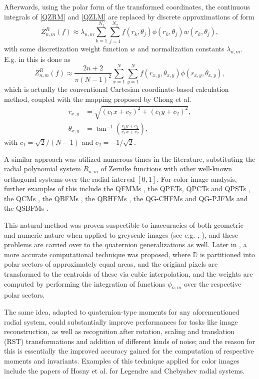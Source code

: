\documentclass[12pt]{article}
\newcommand{\D}{\mathbb{D}}
\begin{document}
Afterwards, using the polar form of the transformed coordinates, the continuous integrals of \eqref{QZRM} and \eqref{QZLM} are replaced by discrete approximations of form
\begin{equation}\label{QZRMappr}
	Z_{n,m}^R(f) \approx \lambda_{n,m} \sum_{k=1}^{N_1} \sum_{j=1}^{N_2} f(r_k,\theta_j) \phi(r_k,\theta_j) w(r_k,\theta_j),
\end{equation}
with some discretization weight function $w$ and normalization constants $\lambda_{n,m}$. E.g. in \cite{ChenOriginal} this is done as
\[
	Z_{n,m}^R(f) \approx \frac{2n+2}{\pi (N-1)^2}  \sum_{x=1}^N \sum_{y=1}^N f(r_{x,y},\theta_{x,y}) \phi(r_{x,y},\theta_{x,y}),
\]
which is actually the conventional Cartesian coordinate-based calculation method, coupled with the mapping proposed by Chong et al. \cite{Chong}
\[
\begin{split}
	r_{x,y} &= \sqrt{(c_1x + c_2)^2 + (c_1y + c_2)^2}, \\
	\theta_{x,y} &= \tan^{-1}\left(\frac{c_1y + c_2}{c_1x + c_2}\right),
\end{split}
\]
with $c_1=\sqrt{2}/(N-1)$ and $c_2=-1/\sqrt{2}$. 

A similar approach was utilized numerous times in the literature, substituting the radial polynomial system $R_{n,m}$ of Zernike functions with other well-known orthogonal systems over the radial interval $[0,1]$. For color image analysis, further examples of this include the QFMMs \cite{GuoZhu}, the QPETs, QPCTs and QPSTs \cite{Li}, the QCMs \cite{Guo}, the QBFMs \cite{Shao}, the QRHFMs \cite{Wang}, the QG-CHFMs and QG-PJFMs \cite{Singh} and the QSBFMs \cite{Yang}.

This natural method was proven suspectible to inaccuracies of both geometric and numeric nature when applied to greyscale images (see e.g.  \cite{LiaoPawlak}, \cite{PawlakLiao}), and these problems are carried over to the quaternion generalizations as well. Later in \cite{Xin}, a more accurate computational technique was proposed, where $\D$ is partitioned into polar sectors of approximately equal areas, and the original pixels are transformed to the centroids of these via cubic interpolation, and the weights are computed by performing the integration of functions $\phi_{n,m}$ over the respective polar sectors. 

The same idea, adapted to quaternion-type moments for any aforementioned radial system, could substantially improve performances for tasks like image reconstruction, as well as recognition after rotation, scaling and translation (RST) transformations and addition of different kinds of noise; and the reason for this is essentially the improved accuracy gained for the computation of respective moments and invariants. Examples of this technique applied for color images include the papers of Hosny et al. for Legendre \cite{HosnyLegendre} and Chebyshev \cite{HosnyChebyshev} radial systems.
\end{document}
